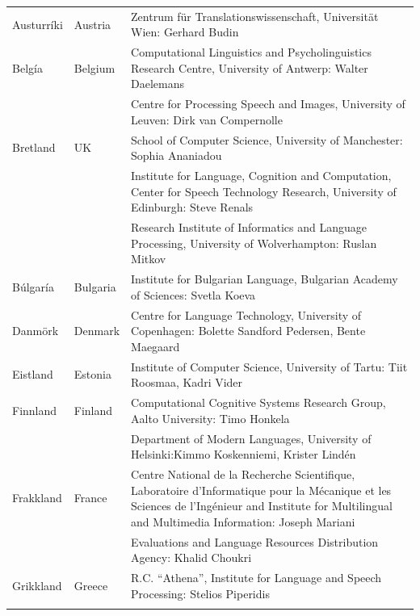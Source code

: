 \small
\begin{longtable}{llp{115mm}}
 Austurríki & \textcolor{grey1}{Austria} & Zentrum für Translationswissenschaft, Universität Wien: Gerhard Budin\\ \addlinespace 
  Belgía & \textcolor{grey1}{Belgium} & Computational Linguistics and Psycholinguistics Research Centre, University of Antwerp: Walter Daelemans\\ \addlinespace
  & & Centre for Processing Speech and Images, University of Leuven: Dirk van Compernolle \\ \addlinespace
  Bretland & \textcolor{grey1}{UK} & 
  School of Computer Science, University of Manchester: Sophia Ananiadou \\ \addlinespace 
  & & Institute for Language, Cognition and Computation, Center for Speech Technology Research, University of Edinburgh: Steve Renals \\ \addlinespace 
  & & Research Institute of Informatics and Language Processing, University of Wolverhampton: Ruslan Mitkov \\ \addlinespace 
  Búlgaría & \textcolor{grey1}{Bulgaria} & Institute for Bulgarian Language, Bulgarian Academy of Sciences: Svetla Koeva \\ \addlinespace
  Danmörk &  \textcolor{grey1}{Denmark} & Centre for Language Technology, University of Copenhagen: \newline Bolette Sandford Pedersen, Bente Maegaard\\ \addlinespace
  Eistland & \textcolor{grey1}{Estonia} & Institute of Computer Science, University of Tartu: Tiit Roosmaa, Kadri Vider\\ \addlinespace
  Finnland & \textcolor{grey1}{Finland} & Computational Cognitive Systems Research Group, Aalto University: Timo Honkela\\ \addlinespace
  & & Department of Modern Languages, University of Helsinki:\newline Kimmo Koskenniemi, Krister Lindén \\ \addlinespace
  Frakkland & \textcolor{grey1}{France} & Centre National de la Recherche Scientifique, Laboratoire d'Informatique pour la Mécanique et les Sciences de l'Ingénieur and Institute for Multilingual and Multimedia Information: Joseph Mariani \\ \addlinespace
  & & Evaluations and Language Resources Distribution Agency: Khalid Choukri\\ \addlinespace 
  Grikkland & \textcolor{grey1}{Greece} & R.C. “Athena”, Institute for Language and Speech Processing: Stelios Piperidis\\ \addlinespace 

\end{longtable}
